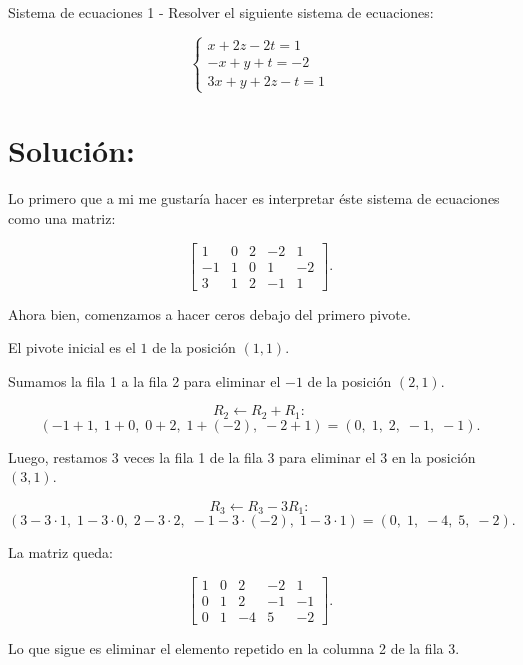 \documentclass[11pt,letterpaper]{article}
\begin{document}
\begin{inciso}{Sistema de ecuaciones 1}
- Resolver el siguiente sistema de ecuaciones:

\[
\begin{cases}
x + 2z - 2t = 1 \\
-x + y + t = -2 \\
3x + y + 2z - t = 1
\end{cases}
\]

\section*{Solución:}
  
    Lo primero que a mi me gustaría hacer es interpretar éste sistema de ecuaciones como una matriz: 
    
    \[
    \left[\begin{array}{cccc|c}
    1 & 0 & 2 & -2 & 1 \\
    -1 & 1 & 0 & 1 & -2 \\
    3 & 1 & 2 & -1 & 1
    \end{array}\right].
    \]
    
    Ahora bien, comenzamos a hacer ceros debajo del primero pivote. 
    
    El pivote inicial es el \(1\) de la posición \((1,1)\).
    
      Sumamos la fila 1 a la fila 2 para eliminar el \(-1\) de la posición \((2,1)\).
    
      \[
      R_2 \leftarrow R_2 + R_1:
      \]
      \[
      (-1 + 1,\; 1+0,\; 0+2,\; 1+(-2),\; -2+1) = (0,\; 1,\; 2,\; -1,\; -1).
      \]
    
      Luego, restamos 3 veces la fila 1 de la fila 3 para eliminar el \(3\) en la posición \((3,1)\).
    
      \[
      R_3 \leftarrow R_3 - 3R_1:
      \]
      \[
      (3-3\cdot1,\; 1-3\cdot0,\; 2-3\cdot2,\; -1-3\cdot(-2),\; 1-3\cdot1) = (0,\; 1,\; -4,\; 5,\; -2).
      \]
    
    La matriz queda:
    
    \[
    \left[\begin{array}{cccc|c}
    1 & 0 & 2 & -2 & 1 \\
    0 & 1 & 2 & -1 & -1 \\
    0 & 1 & -4 & 5 & -2
    \end{array}\right].
    \]
    
    Lo que sigue es eliminar el elemento repetido en la columna 2 de la fila 3. 
    

\end{inciso}
\end{document}

